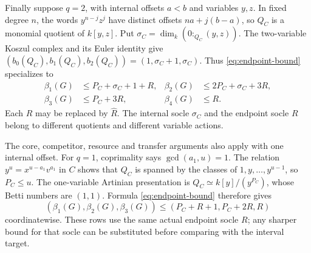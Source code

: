 Finally suppose $q=2$, with internal offsets $a<b$ and variables $y,z$.
In fixed degree $n$, the words $y^{n-j}z^j$ have distinct offsets
$na+j(b-a)$, so $Q_C$ is a monomial quotient of $k[y,z]$.
Put $\sigma_C=\dim_k(0:_{Q_C}(y,z))$.
The two-variable Koszul complex and its Euler identity give
$(b_0(Q_C),b_1(Q_C),b_2(Q_C))=(1,\sigma_C+1,\sigma_C)$.
Thus \eqref{eq:endpoint-bound} specializes to
\begin{equation}\label{eq:endpoint-two-rows}
 \boxed{\begin{aligned}
 \beta_1(G)&\le P_C+\sigma_C+1+R,&
 \beta_2(G)&\le2P_C+\sigma_C+3R,\\
 \beta_3(G)&\le P_C+3R,&\beta_4(G)&\le R.
 \end{aligned}}
\end{equation}
Each $R$ may be replaced by $\widehat R$. The internal socle
$\sigma_C$ and the endpoint socle $R$ belong to different quotients
and different variable actions.

The core, competitor, resource and transfer arguments also apply with
one internal offset. For $q=1$, coprimality says $\gcd(a_1,u)=1$.
The relation $y^u=x^{u-a_1}v^{a_1}$ in $C$ shows that $Q_C$ is
spanned by the classes of $1,y,\ldots,y^{u-1}$, so $P_C\le u$.
The one-variable Artinian presentation is
$Q_C\simeq k[y]/(y^{P_C})$, whose Betti numbers are $(1,1)$.
Formula \eqref{eq:endpoint-bound} therefore gives
\[
 (\beta_1(G),\beta_2(G),\beta_3(G))
 \le (P_C+R+1,P_C+2R,R)
\]
coordinatewise. These rows use the same actual endpoint socle $R$;
any sharper bound for that socle can be substituted before comparing
with the interval target.
